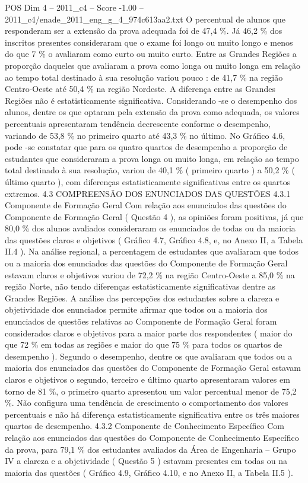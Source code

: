 \begin{textsample}{POS Dim 4 – 2011\_c4 – Score -1.00 – 2011\_c4/enade\_2011\_eng\_g\_4\_974c613aa2.txt}
O percentual de alunos que responderam ser a extensão da prova adequada foi de 47,4 \%.
Já 46,2 \% dos inscritos presentes consideraram que o exame foi longo ou muito longo e menos do que 7 \% o avaliaram como curto ou muito curto.
Entre as Grandes Regiões a proporção daqueles que avaliaram a prova como longa ou muito longa em relação ao tempo total destinado à sua resolução variou pouco : de 41,7 \% na região Centro-Oeste até 50,4 \% na região Nordeste.
A diferença entre as Grandes Regiões não é estatisticamente significativa.
Considerando -se o desempenho dos alunos, dentre os que optaram pela extensão da prova como adequada, os valores percentuais apresentaram tendência decrescente conforme o desempenho, variando de 53,8 \% no primeiro quarto até 43,3 \% no último.
No Gráfico 4.6, pode -se constatar que para os quatro quartos de desempenho a proporção de estudantes que consideraram a prova longa ou muito longa, em relação ao tempo total destinado à sua resolução, variou de 40,1 \% ( primeiro quarto ) a 50,2 \% ( último quarto ), com diferenças estatisticamente significativas entre os quartos extremos. 4.3 COMPREENSÃO DOS ENUNCIADOS DAS QUESTÕES 4.3.1 Componente de Formação Geral Com relação aos enunciados das questões do Componente de Formação Geral ( Questão 4 ), as opiniões foram positivas, já que 80,0 \% dos alunos avaliados consideraram os enunciados de todas ou da maioria das questões claros e objetivos ( Gráfico 4.7, Gráfico 4.8, e, no Anexo II, a Tabela II.4 ).
Na análise regional, a percentagem de estudantes que avaliaram que todos ou a maioria dos enunciados das questões do Componente de Formação Geral estavam claros e objetivos variou de 72,2 \% na região Centro-Oeste a 85,0 \% na região Norte, não tendo diferenças estatisticamente significativas dentre as Grandes Regiões.
A análise das percepções dos estudantes sobre a clareza e objetividade dos enunciados permite afirmar que todos ou a maioria dos enunciados de questões relativas ao Componente de Formação Geral foram considerados claros e objetivos para a maior parte dos respondentes ( maior do que 72 \% em todas as regiões e maior do que 75 \% para todos os quartos de desempenho ).
Segundo o desempenho, dentre os que avaliaram que todos ou a maioria dos enunciados das questões do Componente de Formação Geral estavam claros e objetivos o segundo, terceiro e último quarto apresentaram valores em torno de 81 \%, o primeiro quarto apresentou um valor percentual menor de 75,2 \%.
Não configura uma tendência de crescimento o comportamento dos valores percentuais e não há diferença estatisticamente significativa entre os três maiores quartos de desempenho. 4.3.2 Componente de Conhecimento Específico Com relação aos enunciados das questões do Componente de Conhecimento Específico da prova, para 79,1 \% dos estudantes avaliados da Área de Engenharia – Grupo IV a clareza e a objetividade ( Questão 5 ) estavam presentes em todas ou na maioria das questões ( Gráfico 4.9, Gráfico 4.10, e no Anexo II, a Tabela II.5 ).

\end{textsample}
